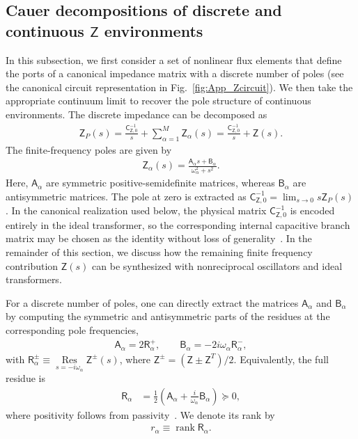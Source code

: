 \documentclass[prx,aps,twocolumn,article]{revtex4-2}
\newcommand{\msf}[1]{\mathsf{#1}}
\newcommand{\msZ}{\msf{Z}}
\newcommand{\msC}{\msf{C}}
\newcommand{\msA}{\msf{A}}
\newcommand{\msB}{\msf{B}}
\newcommand{\msR}{\msf{R}}
\begin{document}
\subsection{Cauer decompositions of discrete and continuous $\msZ$ environments}
\label{Sec:CauerDecomposition}
    In this subsection, we first consider a set of nonlinear flux elements that define the ports of a canonical impedance matrix with a discrete number of poles (see the canonical circuit representation in Fig.~\ref{fig:App_Zcircuit}). We then take the appropriate continuum limit to recover the pole structure of continuous environments. The discrete impedance can be decomposed as
\begin{align}
    \msZ_P(s)
    =
    \frac{\msC_{\msZ,0}^{-1}}{s}
    +
    \sum_{\alpha=1}^{M}\msZ_{\alpha}(s)
    =
    \frac{\msC_{\msZ,0}^{-1}}{s}
    +
    \msZ(s).
    \label{Eq:CauerDiscrete}
\end{align}
The finite-frequency poles are given by
\begin{align}
    \msZ_{\alpha}(s)
    =
    \frac{\msA_{\alpha}s+\msB_{\alpha}}
    {\omega_{\alpha}^2+s^2}.
\end{align}
    Here, $\msA_{\alpha}$ are symmetric positive-semidefinite matrices, whereas $\msB_{\alpha}$ are antisymmetric matrices. The pole at zero is extracted as $\msC_{\msZ,0}^{-1}=\lim_{s\to0}s\msZ_P(s)$. In the canonical realization used below, the physical matrix $\msC_{\msZ,0}^{-1}$ is encoded entirely in the ideal transformer, so the corresponding internal capacitive branch matrix may be chosen as the identity without loss of generality~\cite{Newcomb:1966}. In the remainder of this section, we discuss how the remaining finite frequency contribution $\msZ(s)$ can be synthesized with nonreciprocal oscillators and ideal transformers.

For a discrete number of poles, one can directly extract the matrices $\msA_\alpha$ and $\msB_\alpha$ by computing the symmetric and antisymmetric parts of the residues at the corresponding pole frequencies,
\begin{align}
    \msA_\alpha
    =
    2\msR_\alpha^+,
    \qquad
    \msB_\alpha
    =
    -2i\omega_\alpha\msR_\alpha^-,
    \label{Eq:DiscretePoleMapping}
\end{align}
with $ \msR_\alpha^\pm\equiv\underset{s=-i\omega_\alpha}{\operatorname{Res}}\msZ^\pm(s)$, where $\msZ^\pm=(\msZ\pm\msZ^T)/2$. Equivalently, the full residue is
\begin{align}
    \msR_\alpha
    &=
    \frac{1}{2}
    \left(
        \msA_\alpha
        +
        \frac{i}{\omega_\alpha}
        \msB_\alpha
    \right)
    \succeq0,
    \label{Eq:FullPoleResidue}
\end{align}
where positivity follows from passivity~\cite{Newcomb:1966}. We denote its rank by
\begin{align}
    r_\alpha
    \equiv
    \operatorname{rank}\msR_\alpha.
    \label{Eq:PoleRank}
\end{align}
\end{document}

